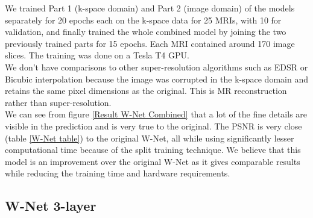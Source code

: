 We trained Part 1 (k-space domain) and Part 2 (image domain) of the models separately for 20 epochs each on the k-space data for 25 MRIs, with 10 for validation, and finally trained the whole combined model by joining the two previously trained parts for 15 epochs. Each MRI contained around 170 image slices. The training was done on a Tesla T4 GPU.\\

We don't have comparisons to other super-resolution algorithms such as EDSR or Bicubic interpolation because the image was corrupted in the k-space domain and retains the same pixel dimensions as the original. This is MR reconstruction rather than super-resolution.\\

We can see from figure \ref{Result W-Net Combined} that a lot of the fine details are visible in the prediction and is very true to the original. The PSNR is very close (table \ref{W-Net table}) to the original W-Net, all while using significantly lesser computational time because of the split training technique. We believe that this model is an improvement over the original W-Net as it gives comparable results while reducing the training time and hardware requirements.


\subsection{W-Net 3-layer}

